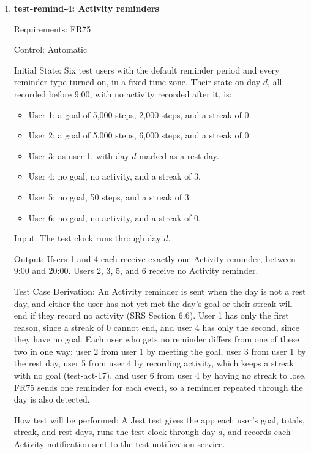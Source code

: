 \documentclass[12pt, titlepage]{article}
\begin{document}
\begin{enumerate}
How test will be performed: As in test-remind-2, with one run for each type.

\item{\textbf{test-remind-4: Activity reminders}\\}

Requirements: FR75

Control: Automatic

Initial State: Six test users with the default reminder period and every
reminder type turned on, in a fixed time zone. Their state on day $d$, all
recorded before 9:00, with no activity recorded after it, is:

\begin{itemize}
  \item User 1: a goal of 5,000 steps, 2,000 steps, and a streak of 0.
  \item User 2: a goal of 5,000 steps, 6,000 steps, and a streak of 0.
  \item User 3: as user 1, with day $d$ marked as a rest day.
  \item User 4: no goal, no activity, and a streak of 3.
  \item User 5: no goal, 50 steps, and a streak of 3.
  \item User 6: no goal, no activity, and a streak of 0.
\end{itemize}

Input: The test clock runs through day $d$.

Output: Users 1 and 4 each receive exactly one Activity reminder, between
9:00 and 20:00. Users 2, 3, 5, and 6 receive no Activity reminder.

Test Case Derivation: An Activity reminder is sent when the day is not a rest
day, and either the user has not yet met the day's goal or their streak will
end if they record no activity (SRS Section 6.6). User 1 has only the first
reason, since a streak of 0 cannot end, and user 4 has only the second, since
they have no goal. Each user who gets no reminder differs from one of these
two in one way: user 2 from user 1 by meeting the goal, user 3 from user 1 by
the rest day, user 5 from user 4 by recording activity, which keeps a streak
with no goal (test-act-17), and user 6 from user 4 by having no streak to
lose. FR75 sends one reminder for each event, so a reminder repeated through
the day is also detected.

How test will be performed: A Jest test gives the app each user's goal,
totals, streak, and rest days, runs the test clock through day $d$, and
records each Activity notification sent to the test notification service.


\end{enumerate}
\end{document}
